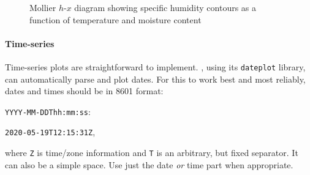 \begin{figure}[tbp]
    \caption[Mollier $h$-$x$ diagram]{%
        Mollier $h$-$x$ diagram showing specific humidity contours
        as a function of temperature and moisture content%
    }
    \label{fig:mollier_diagram}
\end{figure}


\paragraph{Time-series}
Time-series plots are straightforward to implement.
, using its \texttt{dateplot} library, can automatically parse
and plot dates.
For this to work best and most reliably, dates and times should be in
 8601 format:
\begin{center}
    \texttt{YYYY-MM-DDThh:mm:ss\phantom{Z}}:%

    \texttt{2020-05-19T12:15:31Z},
\end{center}
where \texttt{Z} is time\-/zone information and \texttt{T} is an arbitrary, but
fixed separator.
It can also be a simple space.
Use just the date \emph{or} time part when appropriate.

